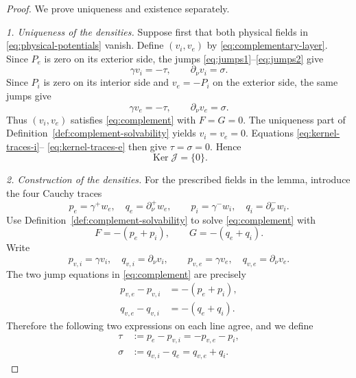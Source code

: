 \documentclass[11pt]{article}
\newcommand{\Ker}{\operatorname{Ker}}
\theoremstyle{plain}
\theoremstyle{definition}
\theoremstyle{remark}
\begin{document}
\begin{proof}
We prove uniqueness and existence separately.

\emph{1. Uniqueness of the densities.}
Suppose first that both physical fields in
\eqref{eq:physical-potentials} vanish.  Define \((v_i,v_e)\) by
\eqref{eq:complementary-layer}.  Since \(P_e\) is zero on its exterior side,
the jumps \eqref{eq:jumps1}--\eqref{eq:jumps2} give
\begin{equation}
\gamma v_i=-\tau,\qquad \partial_\nu v_i=\sigma.
\label{eq:kernel-traces-i}
\end{equation}
Since \(P_i\) is zero on its interior side and \(v_e=-P_i\) on the exterior
side, the same jumps give
\begin{equation}
\gamma v_e=-\tau,\qquad \partial_\nu v_e=\sigma.
\label{eq:kernel-traces-e}
\end{equation}
Thus \((v_i,v_e)\) satisfies \eqref{eq:complement} with \(F=G=0\).  The
uniqueness part of Definition~\ref{def:complement-solvability} yields
\(v_i=v_e=0\).  Equations \eqref{eq:kernel-traces-i}--
\eqref{eq:kernel-traces-e} then give \(\tau=\sigma=0\).  Hence
\begin{equation}
\Ker\mathcal J=\{0\}.
\label{eq:Jinjective}
\end{equation}

\emph{2. Construction of the densities.}
For the prescribed fields in the lemma, introduce the four Cauchy traces
\begin{equation}
p_e=\gamma^+w_e,\quad q_e=\partial_\nu^+w_e,
\qquad
p_i=\gamma^-w_i,\quad q_i=\partial_\nu^-w_i.
\label{eq:w-traces}
\end{equation}
Use Definition~\ref{def:complement-solvability} to solve
\eqref{eq:complement} with
\begin{equation}
F=-(p_e+p_i),\qquad G=-(q_e+q_i).
\label{eq:complement-data-from-w}
\end{equation}
Write
\[
p_{v,i}=\gamma v_i,\quad q_{v,i}=\partial_\nu v_i,
\qquad
p_{v,e}=\gamma v_e,\quad q_{v,e}=\partial_\nu v_e.
\]
The two jump equations in \eqref{eq:complement} are precisely
\begin{align}
p_{v,e}-p_{v,i}&=-(p_e+p_i),\label{eq:vjump-p}\\
q_{v,e}-q_{v,i}&=-(q_e+q_i).\label{eq:vjump-q}
\end{align}
Therefore the following two expressions on each line agree, and we define
\begin{align}
\tau&:=p_e-p_{v,i}=-p_{v,e}-p_i,\label{eq:density-tau}\\
\sigma&:=q_{v,i}-q_e=q_{v,e}+q_i.\label{eq:density-sigma}
\end{align}


\end{proof}
\end{document}

